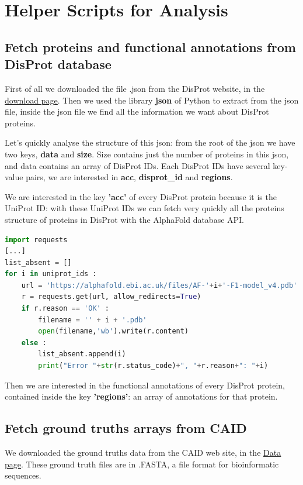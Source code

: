 \pagebreak

\section{Helper Scripts for Analysis}\label{analysis-procedures}
\subsection{Fetch proteins and functional annotations from DisProt database}
First of all we downloaded the file .json from the DisProt website, in the \href{https://disprot.org/download}{\underline{download page}}. Then we used the library \textbf{json} of Python to extract from the json file, inside the json file we find all the information we want about DisProt proteins. 

Let's quickly analyse the structure of this json: from the root of the json we have two keys, \textbf{data} and \textbf{size}. Size contains just the number of proteins in this json, and data contains an array of DisProt IDs. Each DisProt IDs have several key-value pairs, we are interested in \textbf{acc}, \textbf{disprot\_id} and \textbf{regions}.

We are interested in the key \textbf{'acc'} of every DisProt protein because it is the UniProt ID: with these UniProt IDs we can fetch very quickly all the proteins structure of proteins in DisProt with the AlphaFold database API.
\begin{lstlisting}[language=Python, caption=Script to use AlphaFold database API]
import requests
[...]
list_absent = []
for i in uniprot_ids :
    url = 'https://alphafold.ebi.ac.uk/files/AF-'+i+'-F1-model_v4.pdb'
    r = requests.get(url, allow_redirects=True)
    if r.reason == 'OK' :
        filename = '' + i + '.pdb'
        open(filename,'wb').write(r.content)
    else :
        list_absent.append(i)
        print("Error "+str(r.status_code)+", "+r.reason+": "+i)
\end{lstlisting}

Then we are interested in the functional annotations of every DisProt protein, contained inside the key \textbf{'regions'}:  an array of annotations for that protein.

\pagebreak

\subsection{Fetch ground truths arrays from CAID}
We downloaded the ground truths data from the CAID web site, in the \href{https://caid.idpcentral.org/challenge#Data}{\underline{Data page}}. These ground truth files are in .FASTA, a file format for bioinformatic sequences. 

